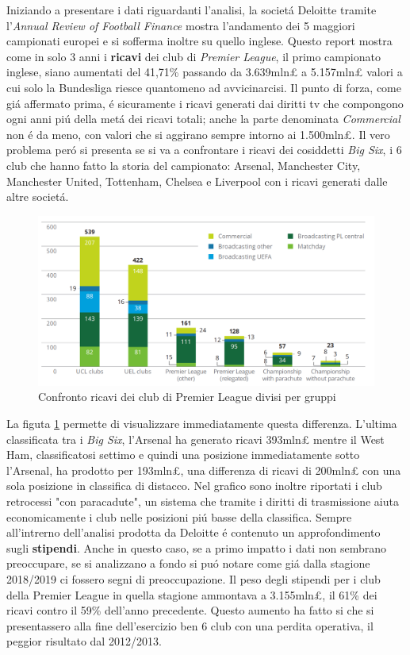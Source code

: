 \documentclass[
    corpo=12pt,
    oneside,
    evenboxes,
    tipotesi=triennale,
    stile=classica,
    oldstyle,
    autoretitolo,
    greek,
]{toptesi}
\begin{document}
\begin{interlinea}{1.5}
Iniziando a presentare i dati riguardanti l'analisi, la societ\'a Deloitte tramite l'\emph{Annual Review of Football Finance} mostra
l'andamento dei 5 maggiori campionati europei e si sofferma inoltre su quello inglese. Questo report mostra come in solo 3 anni i \textbf{ricavi} 
dei club di \emph{Premier League}, il primo campionato inglese, siano aumentati del 41,71\% passando da 3.639mln£ a 5.157mln£ valori a cui solo
la Bundesliga riesce quantomeno ad avvicinarcisi. Il punto di forza, come gi\'a affermato prima, \'e sicuramente i ricavi generati dai diritti
tv che compongono ogni anni pi\'u della met\'a dei ricavi totali; anche la parte denominata \emph{Commercial} non \'e da meno, con valori
che si aggirano sempre intorno ai 1.500mln£. Il vero problema per\'o si presenta se si va a confrontare i ricavi dei cosiddetti \emph{Big Six}, 
i 6 club che hanno fatto la storia del campionato: Arsenal, Manchester City, Manchester United, Tottenham, Chelsea e Liverpool con i ricavi
generati dalle altre societ\'a.
\begin{figure}
    \centering
    \includegraphics[scale=0.5]{img/ricavi_premier.png}
    \caption{Confronto ricavi dei club di Premier League divisi per gruppi}
    \label{ricavi_premier}
\end{figure} 
La figuta \ref{ricavi_premier} permette di visualizzare immediatamente questa differenza. L'ultima classificata tra i \emph{Big Six},
l'Arsenal ha generato ricavi 393mln£ mentre il West Ham, classificatosi settimo e quindi una posizione immediatamente sotto l'Arsenal, ha 
prodotto per 193mln£, una differenza di ricavi di 200mln£ con una sola posizione in classifica di distacco. Nel grafico sono inoltre riportati
i club retrocessi "con paracadute", un sistema che tramite i diritti di trasmissione aiuta economicamente i club nelle posizioni
pi\'u basse della classifica.\newline
Sempre all'intrerno dell'analisi prodotta da Deloitte \'e contenuto un approfondimento sugli \textbf{stipendi}. Anche in questo caso, se a
primo impatto i dati non sembrano preoccupare, se si analizzano a fondo si pu\'o notare come gi\'a dalla stagione 2018/2019 ci fossero segni
di preoccupazione. Il peso degli stipendi per i club della Premier League in quella stagione ammontava a 3.155mln£, il 61\% dei ricavi contro il 
59\% dell'anno precedente. Questo aumento ha fatto si che si presentassero alla fine dell'esercizio ben 6 club con una perdita operativa, il 
peggior risultato dal 2012/2013.\newline

\end{interlinea}
\end{document}
